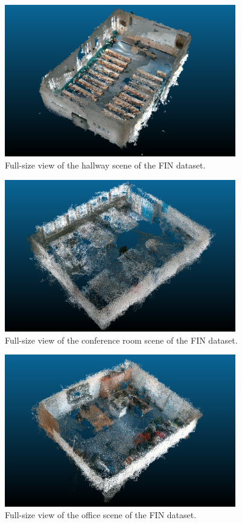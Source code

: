 \documentclass[main.tex]{subfiles}
\begin{document}
\begin{figure}[H]
    \centering
    \includegraphics[width=0.9\textwidth]{images/307.png}
    \caption[FIN Auditorium Scene]{Full-size view of the hallway scene of the FIN dataset.}
    \label{fig:fin307-app}
\end{figure}
\begin{figure}[H]
    \centering
    \includegraphics[width=0.9\textwidth]{images/333.png}
    \caption[FIN Conference Room Scene]{Full-size view of the conference room scene of the FIN dataset.}
    \label{fig:fin333-app}
\end{figure}
\begin{figure}[H]
    \centering
    \includegraphics[width=0.9\textwidth]{images/425.png}
    \caption[FIN Office Scene]{Full-size view of the office scene of the FIN dataset.}
    \label{fig:fin425-app}
\end{figure}
\end{document}
